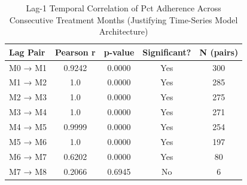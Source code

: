 \begin{table}[htbp]

\caption{Lag-1 Temporal Correlation of Pct Adherence Across Consecutive Treatment Months (Justifying Time-Series Model Architecture)}
\label{tab:lag_correlation_matrix}
\centering
\begin{tabular}{lcccc}

\toprule

Lag Pair & Pearson r & p-value & Significant? & N (pairs) \\

\midrule

M0 → M1 & 0.9242 & 0.0000 & Yes & 300 \\
M1 → M2 & 1.0 & 0.0000 & Yes & 285 \\
M2 → M3 & 1.0 & 0.0000 & Yes & 275 \\
M3 → M4 & 1.0 & 0.0000 & Yes & 271 \\
M4 → M5 & 0.9999 & 0.0000 & Yes & 254 \\
M5 → M6 & 1.0 & 0.0000 & Yes & 197 \\
M6 → M7 & 0.6202 & 0.0000 & Yes & 80 \\
M7 → M8 & 0.2066 & 0.6945 & No & 6 \\

\bottomrule

\end{tabular}

\end{table}